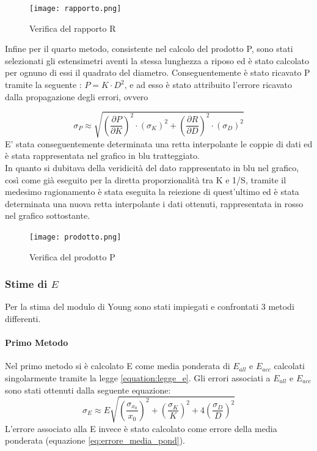 \documentclass[a4paper,11pt,oneside]{article}
\begin{document}
\begin{figure}[h!]
    \centering

        \label{fig:a_lunghezza_cost}
        \texttt{[image: rapporto.png]}
        \caption{Verifica del rapporto R}
\end{figure}
Infine per il quarto metodo, consistente nel calcolo del prodotto P, sono stati selezionati gli estensimetri aventi la stessa lunghezza a riposo ed è stato calcolato per ognuno di essi il quadrato del diametro. Conseguentemente è stato ricavato P tramite la seguente : $P= K \cdot D^2 $, e ad esso è stato attribuito l'errore  ricavato dalla propagazione degli errori, ovvero 

\begin{equation*}
    \sigma_P \approx \sqrt{\left ( \frac{\partial P }{\partial K} \right )^2 \cdot \left ( \sigma_K \right )^2 + \left ( \frac{\partial R }{\partial D} \right )^2 \cdot \left ( \sigma_D \right )^2 }
\end{equation*}
E' stata conseguentemente determinata una retta interpolante le coppie di dati ed è stata rappresentata nel grafico in blu tratteggiato.\\
In quanto si dubitava della veridicità del dato rappresentato in blu nel grafico, così come già eseguito per la diretta proporzionalità tra K e 1/S, tramite il medesimo ragionamento è stata eseguita la reiezione di quest'ultimo ed è stata determinata una nuova retta interpolante i dati ottenuti, rappresentata in rosso nel grafico sottostante.

\begin{figure}[h!]
    \centering
    
        \label{fig:a_lunghezza_cost}
        \texttt{[image: prodotto.png]}
        \caption{Verifica del prodotto P}
\end{figure}

\subsubsection*{Stime di $E$}
Per la stima del modulo di Young sono stati impiegati e confrontati 3 metodi differenti.

\paragraph{Primo Metodo} Nel primo metodo si è calcolato E come media ponderata di $E_{all}$ e $E_{acc}$ calcolati singolarmente tramite la legge \ref{equation:legge_e}. Gli errori associati a $E_{all}$ e $E_{acc}$ sono stati ottenuti dalla seguente equazione:
\begin{equation*}
    \sigma_{E} \approx E\sqrt{\left(\frac{\sigma_{x_{0}}}{x_{0}}\right)^2+\left(\frac{\sigma_{K}}{K}\right)^2+4\left(\frac{\sigma_{D}}{D}\right)^2}
    \label{eq:propagazione_particolare}
\end{equation*}
L'errore associato alla E invece è stato calcolato come errore della media ponderata (equazione \ref{eq:errore_media_pond}).
\end{document}
